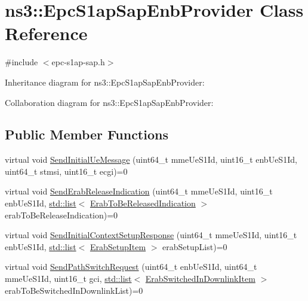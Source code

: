 \hypertarget{classns3_1_1EpcS1apSapEnbProvider}{}\section{ns3\+:\+:Epc\+S1ap\+Sap\+Enb\+Provider Class Reference}
\label{classns3_1_1EpcS1apSapEnbProvider}


{\ttfamily \#include $<$epc-\/s1ap-\/sap.\+h$>$}



Inheritance diagram for ns3\+:\+:Epc\+S1ap\+Sap\+Enb\+Provider\+:


Collaboration diagram for ns3\+:\+:Epc\+S1ap\+Sap\+Enb\+Provider\+:
\subsection*{Public Member Functions}
\begin{DoxyCompactItemize}
\item 
virtual void \hyperlink{classns3_1_1EpcS1apSapEnbProvider_a0c687c7ee8b9b2da256498407a75b4ab}{Send\+Initial\+Ue\+Message} (uint64\+\_\+t mme\+Ue\+S1\+Id, uint16\+\_\+t enb\+Ue\+S1\+Id, uint64\+\_\+t stmsi, uint16\+\_\+t ecgi)=0
\item 
virtual void \hyperlink{classns3_1_1EpcS1apSapEnbProvider_a84baa4fcb0d591810b3512f7e71580d4}{Send\+Erab\+Release\+Indication} (uint64\+\_\+t mme\+Ue\+S1\+Id, uint16\+\_\+t enb\+Ue\+S1\+Id, \hyperlink{openflow-interface_8h_afd9bcfa176617760671b67580f536fa7}{std\+::list}$<$ \hyperlink{structns3_1_1EpcS1apSap_1_1ErabToBeReleasedIndication}{Erab\+To\+Be\+Released\+Indication} $>$ erab\+To\+Be\+Release\+Indication)=0
\item 
virtual void \hyperlink{classns3_1_1EpcS1apSapEnbProvider_ab87e7520d1c63527f6b6d7457fd7b2c4}{Send\+Initial\+Context\+Setup\+Response} (uint64\+\_\+t mme\+Ue\+S1\+Id, uint16\+\_\+t enb\+Ue\+S1\+Id, \hyperlink{openflow-interface_8h_afd9bcfa176617760671b67580f536fa7}{std\+::list}$<$ \hyperlink{structns3_1_1EpcS1apSap_1_1ErabSetupItem}{Erab\+Setup\+Item} $>$ erab\+Setup\+List)=0
\item 
virtual void \hyperlink{classns3_1_1EpcS1apSapEnbProvider_a72780aeea16664e1836385c36cc98c67}{Send\+Path\+Switch\+Request} (uint64\+\_\+t enb\+Ue\+S1\+Id, uint64\+\_\+t mme\+Ue\+S1\+Id, uint16\+\_\+t gci, \hyperlink{openflow-interface_8h_afd9bcfa176617760671b67580f536fa7}{std\+::list}$<$ \hyperlink{structns3_1_1EpcS1apSap_1_1ErabSwitchedInDownlinkItem}{Erab\+Switched\+In\+Downlink\+Item} $>$ erab\+To\+Be\+Switched\+In\+Downlink\+List)=0
\end{DoxyCompactItemize}



